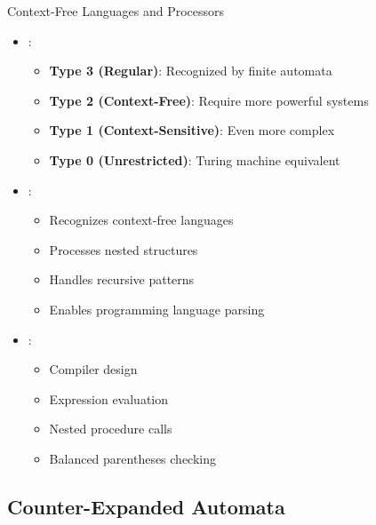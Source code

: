 \begin{frame}{Context-Free Languages and Processors}
\begin{itemize}
\item {}:
\begin{itemize}
\item \textbf{Type 3 (Regular)}: Recognized by finite automata
\item \textbf{Type 2 (Context-Free)}: Require more powerful systems
\item \textbf{Type 1 (Context-Sensitive)}: Even more complex
\item \textbf{Type 0 (Unrestricted)}: Turing machine equivalent
\end{itemize}
\vspace{0.5cm}
\item {}:
\begin{itemize}
\item Recognizes context-free languages
\item Processes nested structures
\item Handles recursive patterns
\item Enables programming language parsing
\end{itemize}
\vspace{0.3cm}
\item {}:
\begin{itemize}
\item Compiler design
\item Expression evaluation
\item Nested procedure calls
\item Balanced parentheses checking
\end{itemize}
\end{itemize}
\end{frame}

\subsection{Counter-Expanded Automata}

